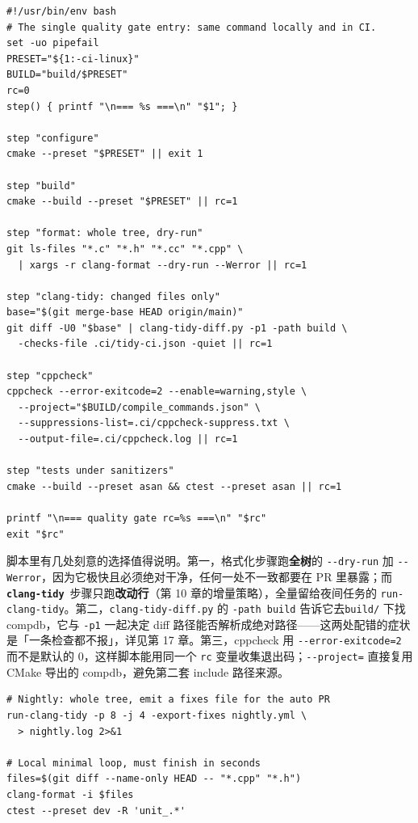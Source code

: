 \documentclass[12pt,a4paper,fontset=fandol]{ctexbook}
\newcommand{\Opt}[1]{\texttt{-\/-#1}}
\newcommand{\Bk}{\discretionary{}{}{}}
\newcommand{\Lib}[1]{\textbf{\texttt{#1}}}
\newcommand{\Tidy}{\Lib{clang-tidy}}
\begin{document}
\begin{lstlisting}[style=shellstyle,caption={仓库级质量门脚本 scripts/verify.sh},label={lst:ch16-verify}]
#!/usr/bin/env bash
# The single quality gate entry: same command locally and in CI.
set -uo pipefail
PRESET="${1:-ci-linux}"
BUILD="build/$PRESET"
rc=0
step() { printf "\n=== %s ===\n" "$1"; }

step "configure"
cmake --preset "$PRESET" || exit 1

step "build"
cmake --build --preset "$PRESET" || rc=1

step "format: whole tree, dry-run"
git ls-files "*.c" "*.h" "*.cc" "*.cpp" \
  | xargs -r clang-format --dry-run --Werror || rc=1

step "clang-tidy: changed files only"
base="$(git merge-base HEAD origin/main)"
git diff -U0 "$base" | clang-tidy-diff.py -p1 -path build \
  -checks-file .ci/tidy-ci.json -quiet || rc=1

step "cppcheck"
cppcheck --error-exitcode=2 --enable=warning,style \
  --project="$BUILD/compile_commands.json" \
  --suppressions-list=.ci/cppcheck-suppress.txt \
  --output-file=.ci/cppcheck.log || rc=1

step "tests under sanitizers"
cmake --build --preset asan && ctest --preset asan || rc=1

printf "\n=== quality gate rc=%s ===\n" "$rc"
exit "$rc"
\end{lstlisting}

脚本里有几处刻意的选择值得说明。第一，格式化步骤跑\textbf{全树}的 \Opt{dry-run} 加 \Opt{Werror}，因为它极快且必须绝对干净，任何一处不一致都要在 PR 里暴露；而 \Tidy\ 步骤只跑\textbf{改动行}（第 10 章的增量策略），全量留给夜间任务的 \texttt{run-{\Bk}clang-{\Bk}tidy}。第二，\texttt{clang-{\Bk}tidy-{\Bk}diff.py} 的 \texttt{-path build} 告诉它去\texttt{build/} 下找 compdb，它与 \texttt{-p1} 一起决定 diff 路径能否解析成绝对路径——这两处配错的症状是「一条检查都不报」，详见第 17 章。第三，cppcheck 用 \Opt{error-{\Bk}exitcode=2} 而不是默认的 0，这样脚本能用同一个 \texttt{rc} 变量收集退出码；\Opt{project=} 直接复用 CMake 导出的 compdb，避免第二套 include 路径来源。

\begin{lstlisting}[style=shellstyle,caption={夜间全量与本地最小闭环}]
# Nightly: whole tree, emit a fixes file for the auto PR
run-clang-tidy -p 8 -j 4 -export-fixes nightly.yml \
  > nightly.log 2>&1

# Local minimal loop, must finish in seconds
files=$(git diff --name-only HEAD -- "*.cpp" "*.h")
clang-format -i $files
ctest --preset dev -R 'unit_.*'
\end{lstlisting}
\end{document}
